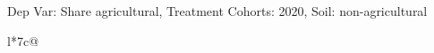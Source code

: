\begin{table}[H]
\captionlistentry[table]{}
\label{table:beaver_land_class_DVis_land_class_1_SCg3_SSNAG}
\scriptsize %
Dep Var: Share agricultural, Treatment Cohorts: 2020, Soil: non-agricultural \\
\begin{threeparttable}
\begin{tabulary}{\textwidth}{l*{7}{c}@{}}
\toprule \toprule
\noalign{\smallskip}
\noalign{\smallskip}
\midrule \bottomrule
\end{tabulary}
\medskip
\end{threeparttable}
\end{table}
